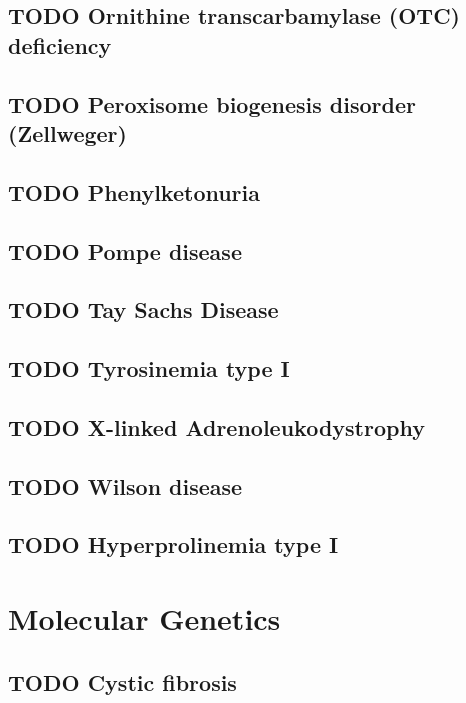 \documentclass{scrartcl}
\begin{document}
\subsection{{\bfseries\sffamily TODO} Ornithine transcarbamylase (OTC) deficiency}
\label{sec:orgece3d55}
\subsection{{\bfseries\sffamily TODO} Peroxisome biogenesis disorder (Zellweger)}
\label{sec:org902ad67}
\subsection{{\bfseries\sffamily TODO} Phenylketonuria}
\label{sec:org23c2ec4}
\subsection{{\bfseries\sffamily TODO} Pompe disease}
\label{sec:orgae5c993}
\subsection{{\bfseries\sffamily TODO} Tay Sachs Disease}
\label{sec:orgaad311b}
\subsection{{\bfseries\sffamily TODO} Tyrosinemia type I}
\label{sec:org289af5c}
\subsection{{\bfseries\sffamily TODO} X-linked Adrenoleukodystrophy}
\label{sec:org976f77c}
\subsection{{\bfseries\sffamily TODO} Wilson disease}
\label{sec:orge52b9ba}
\subsection{{\bfseries\sffamily TODO} Hyperprolinemia type I}
\label{sec:org144ed82}

\section{Molecular Genetics}
\label{sec:orgc929732}
\subsection{{\bfseries\sffamily TODO} Cystic fibrosis}
\label{sec:org6df3261}
\end{document}
